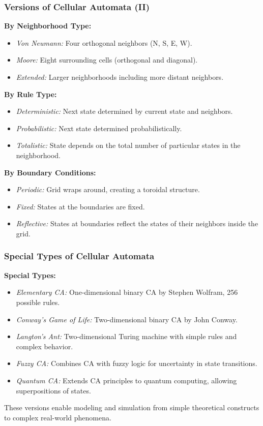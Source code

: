 \documentclass{beamer}
\begin{document}
\begin{frame}
    \frametitle{Versions of Cellular Automata (II)}
    \textbf{By Neighborhood Type:}
    \begin{itemize}
        \item \textit{Von Neumann:} Four orthogonal neighbors (N, S, E, W).
        \item \textit{Moore:} Eight surrounding cells (orthogonal and diagonal).
        \item \textit{Extended:} Larger neighborhoods including more distant neighbors.
    \end{itemize}
    \textbf{By Rule Type:}
    \begin{itemize}
        \item \textit{Deterministic:} Next state determined by current state and neighbors.
        \item \textit{Probabilistic:} Next state determined probabilistically.
        \item \textit{Totalistic:} State depends on the total number of particular states in the neighborhood.
    \end{itemize}
    \textbf{By Boundary Conditions:}
    \begin{itemize}
        \item \textit{Periodic:} Grid wraps around, creating a toroidal structure.
        \item \textit{Fixed:} States at the boundaries are fixed.
        \item \textit{Reflective:} States at boundaries reflect the states of their neighbors inside the grid.
    \end{itemize}
\end{frame}

\begin{frame}
    \frametitle{Special Types of Cellular Automata}
    \textbf{Special Types:}
    \begin{itemize}
        \item \textit{Elementary CA:} One-dimensional binary CA by Stephen Wolfram, 256 possible rules.
        \item \textit{Conway’s Game of Life:} Two-dimensional binary CA by John Conway.
        \item \textit{Langton’s Ant:} Two-dimensional Turing machine with simple rules and complex behavior.
        \item \textit{Fuzzy CA:} Combines CA with fuzzy logic for uncertainty in state transitions.
        \item \textit{Quantum CA:} Extends CA principles to quantum computing, allowing superpositions of states.
    \end{itemize}
    These versions enable modeling and simulation from simple theoretical constructs to complex real-world phenomena.
\end{frame}
\end{document}
